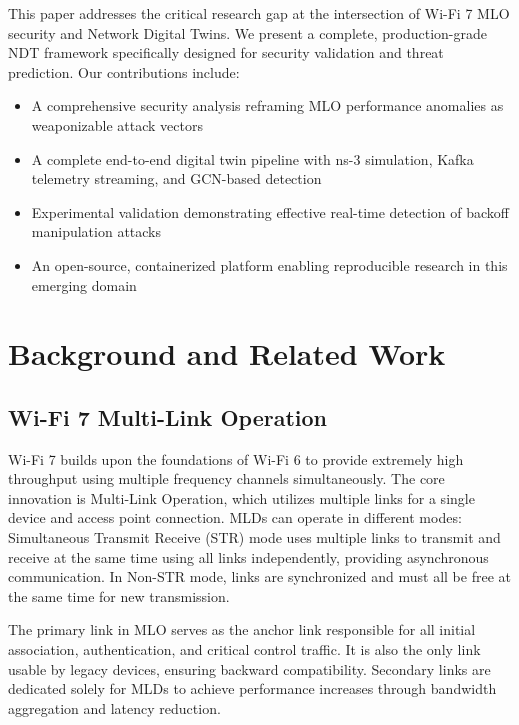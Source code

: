\documentclass[conference]{IEEEtran}
\begin{document}
This paper addresses the critical research gap at the intersection of Wi-Fi 7 MLO security and Network Digital Twins. We present a complete, production-grade NDT framework specifically designed for security validation and threat prediction. Our contributions include:

\begin{itemize}
    \item A comprehensive security analysis reframing MLO performance anomalies as weaponizable attack vectors
    \item A complete end-to-end digital twin pipeline with ns-3 simulation, Kafka telemetry streaming, and GCN-based detection
    \item Experimental validation demonstrating effective real-time detection of backoff manipulation attacks
    \item An open-source, containerized platform enabling reproducible research in this emerging domain
\end{itemize}

\section{Background and Related Work}
\label{sec:background}

\subsection{Wi-Fi 7 Multi-Link Operation}

Wi-Fi 7 builds upon the foundations of Wi-Fi 6 to provide extremely high throughput using multiple frequency channels simultaneously. The core innovation is Multi-Link Operation, which utilizes multiple links for a single device and access point connection. MLDs can operate in different modes: Simultaneous Transmit Receive (STR) mode uses multiple links to transmit and receive at the same time using all links independently, providing asynchronous communication. In Non-STR mode, links are synchronized and must all be free at the same time for new transmission.

The primary link in MLO serves as the anchor link responsible for all initial association, authentication, and critical control traffic. It is also the only link usable by legacy devices, ensuring backward compatibility. Secondary links are dedicated solely for MLDs to achieve performance increases through bandwidth aggregation and latency reduction.
\end{document}

